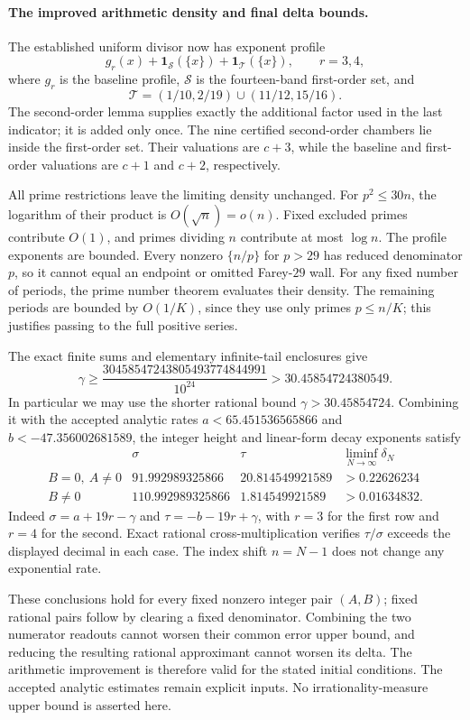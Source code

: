 \paragraph{The improved arithmetic density and final delta bounds.}
The established uniform divisor now has exponent profile
\[
 g_r(x)+\mathbf1_{\mathcal S}(\{x\})
       +\mathbf1_{\mathcal T}(\{x\}),\qquad r=3,4,
\]
where $g_r$ is the baseline profile, $\mathcal S$ is the fourteen-band
first-order set, and
\[
 \mathcal T=(1/10,2/19)\cup(11/12,15/16).
\]
The second-order lemma supplies exactly the additional factor used in the
last indicator; it is added only once. The nine certified second-order
chambers lie inside the first-order set. Their valuations are $c+3$, while
the baseline and first-order valuations are $c+1$ and $c+2$, respectively.

All prime restrictions leave the limiting density unchanged. For
$p^2\le30n$, the logarithm of their product is $O(\sqrt n)=o(n)$.
Fixed excluded primes contribute $O(1)$, and primes dividing $n$ contribute
at most $\log n$. The profile exponents are bounded. Every nonzero
$\{n/p\}$ for $p>29$ has reduced denominator $p$, so it cannot equal an
endpoint or omitted Farey-$29$ wall. For any fixed number of periods, the
prime number theorem evaluates their density. The remaining periods are
bounded by $O(1/K)$, since they use only primes $p\le n/K$; this justifies
passing to the full positive series.

The exact finite sums and elementary infinite-tail enclosures give
\[
 \gamma\ge
 \frac{30458547243805493774844991}{10^{24}}
 >30.45854724380549.
\]
In particular we may use the shorter rational bound $\gamma>30.45854724$.
Combining it with the accepted analytic rates
$a<65.451536565866$ and $b<-47.356002681589$, the integer height and
linear-form decay exponents satisfy
\[
\begin{array}{c|cc|c}
 &\sigma&\tau&\liminf_{N\to\infty}\delta_N\\\hline
 B=0,\ A\ne0
 &91.992989325866&20.814549921589&>0.22626234\\
 B\ne0
 &110.992989325866&1.814549921589&>0.01634832.
\end{array}
\]
Indeed $\sigma=a+19r-\gamma$ and $\tau=-b-19r+\gamma$, with $r=3$ for
the first row and $r=4$ for the second. Exact rational cross-multiplication
verifies $\tau/\sigma$ exceeds the displayed decimal in each case.
The index shift $n=N-1$ does not change any exponential rate.

These conclusions hold for every fixed nonzero integer pair $(A,B)$;
fixed rational pairs follow by clearing a fixed denominator. Combining
the two numerator readouts cannot worsen their common error upper bound,
and reducing the resulting rational approximant cannot worsen its delta.
The arithmetic improvement is therefore valid for the stated initial
conditions. The accepted analytic estimates remain explicit inputs.
No irrationality-measure upper bound is asserted here.
